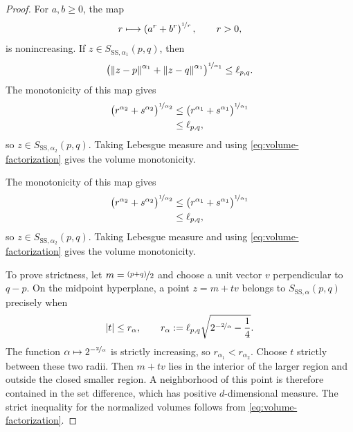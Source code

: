 \documentclass[a4paper,fleqn]{cas-dc}
\theoremstyle{definition}
\theoremstyle{remark}
\newcommand{\norm}[1]{\left\lVert #1\right\rVert}
\newcommand{\ellpq}{\ell_{p,q}}
\newcommand{\0}{\mathbf{0}}
\begin{document}
\begin{proof}
For $a,b\geq0$, the map
\begin{equation}
    r\longmapsto \left(a^r+b^r\right)^{\nicefrac{1}{r}},
    \qquad r>0,
\end{equation}
is nonincreasing. If $z\in S_{\mathrm{SS},\alpha_1}(p,q)$, then
\begin{equation}
\bigl(\norm{z-p}^{\alpha_1}+\norm{z-q}^{\alpha_1}\bigr)^{\nicefrac{1}{\alpha_1}}
\leq \ellpq.
\end{equation}
The monotonicity of this map gives
\begin{equation}
\begin{aligned}
\bigl(r^{\alpha_2}+s^{\alpha_2}\bigr)^{
\nicefrac{1}{\alpha_2}}
&\leq
\bigl(r^{\alpha_1}+s^{\alpha_1}\bigr)^{
\nicefrac{1}{\alpha_1}}
\\
&\leq \ellpq,
\end{aligned}
\end{equation}
so $z\in S_{\mathrm{SS},\alpha_2}(p,q)$. Taking Lebesgue
measure and using \eqref{eq:volume-factorization} gives the volume
monotonicity.

The monotonicity of this map gives
\begin{equation}
\begin{aligned}
\bigl(r^{\alpha_2}+s^{\alpha_2}\bigr)^{
\nicefrac{1}{\alpha_2}}
&\leq
\bigl(r^{\alpha_1}+s^{\alpha_1}\bigr)^{
\nicefrac{1}{\alpha_1}}
\\
&\leq \ellpq,
\end{aligned}
\end{equation}
so $z\in S_{\mathrm{SS},\alpha_2}(p,q)$. Taking Lebesgue
measure and using \eqref{eq:volume-factorization} gives the volume
monotonicity.

To prove strictness, let $m=\nicefrac{(p+q)}{2}$ and choose a unit vector $v$
perpendicular to $q-p$. On the midpoint hyperplane, a point $z=m+tv$ belongs
to $S_{\mathrm{SS},\alpha}(p,q)$ precisely when
\begin{equation}
    |t|\leq r_{\alpha},
    \qquad
    r_{\alpha}
    :=
    \ellpq\sqrt{2^{-\nicefrac{2}{\alpha}}-\frac14}.
\end{equation}
The function $\alpha\mapsto2^{-\nicefrac{2}{\alpha}}$ is strictly increasing, so
$r_{\alpha_1}<r_{\alpha_2}$. Choose $t$ strictly between these two radii.
Then $m+tv$ lies in the interior of the larger region and outside the closed
smaller region. A neighborhood of this point is therefore contained in the
set difference, which has positive $d$-dimensional measure. The strict
inequality for the normalized volumes follows from
\eqref{eq:volume-factorization}.
\end{proof}
\end{document}
